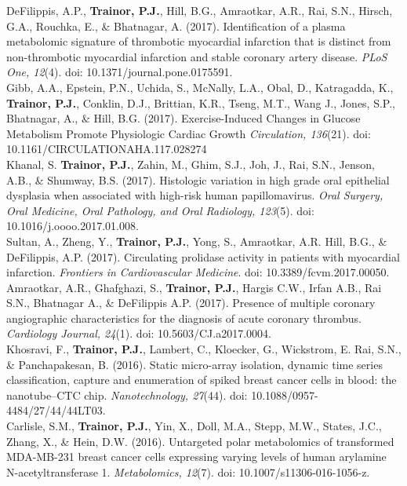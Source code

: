 {DeFilippis, A.P., \textbf{Trainor, P.J.}, Hill, B.G., Amraotkar, A.R., Rai, S.N., Hirsch, G.A., Rouchka, E., \& Bhatnagar, A. (2017). Identification of a plasma metabolomic signature of thrombotic myocardial infarction that is distinct from non-thrombotic myocardial infarction and stable coronary artery disease. \emph{PLoS One, 12}(4). doi: 10.1371/journal.pone.0175591. \\

Gibb, A.A., Epstein, P.N., Uchida, S., McNally, L.A., Obal, D., Katragadda, K., \textbf{Trainor, P.J.},  Conklin, D.J., Brittian, K.R., Tseng, M.T., Wang J., Jones, S.P., Bhatnagar, A., \& Hill, B.G. (2017). Exercise-Induced Changes in Glucose Metabolism Promote Physiologic Cardiac Growth \emph{Circulation, 136}(21). doi: 10.1161/CIRCULATIONAHA.117.028274 \\

Khanal, S. \textbf{Trainor, P.J.}, Zahin, M., Ghim, S.J., Joh, J., Rai, S.N., Jenson, A.B., \& Shumway, B.S. (2017). Histologic variation in high grade oral epithelial dysplasia when associated with high-risk human papillomavirus.  \emph{Oral Surgery, Oral Medicine, Oral Pathology, and Oral Radiology, 123}(5). doi: 10.1016/j.oooo.2017.01.008. \\

Sultan, A., Zheng, Y., \textbf{Trainor, P.J.}, Yong, S., Amraotkar, A.R.  Hill, B.G., \& DeFilippis, A.P. (2017). Circulating prolidase activity in patients with myocardial infarction. \emph{Frontiers in Cardiovascular Medicine}. doi: 10.3389/fcvm.2017.00050.  \\

Amraotkar, A.R., Ghafghazi, S., \textbf{Trainor, P.J.}, Hargis C.W., Irfan A.B., Rai S.N., Bhatnagar A., \& DeFilippis A.P. (2017). Presence of multiple coronary angiographic characteristics for the diagnosis of acute coronary thrombus. \emph{Cardiology Journal, 24}(1). doi: 10.5603/CJ.a2017.0004.  \\

Khosravi, F., \textbf{Trainor, P.J.}, Lambert, C., Kloecker, G., Wickstrom, E. Rai, S.N., \& Panchapakesan, B. (2016). Static micro-array isolation, dynamic time series classification, capture and enumeration of spiked breast cancer cells in blood: the nanotube--CTC chip. \emph{Nanotechnology, 27}(44). doi: 10.1088/0957-4484/27/44/44LT03.  \\

Carlisle, S.M., \textbf{Trainor, P.J.}, Yin, X., Doll, M.A., Stepp, M.W., States, J.C., Zhang, X., \& Hein, D.W. (2016). Untargeted polar metabolomics of transformed MDA-MB-231 breast cancer cells expressing varying levels of human arylamine N-acetyltransferase 1. \emph{Metabolomics, 12}(7). doi: 10.1007/s11306-016-1056-z.  \\

}
